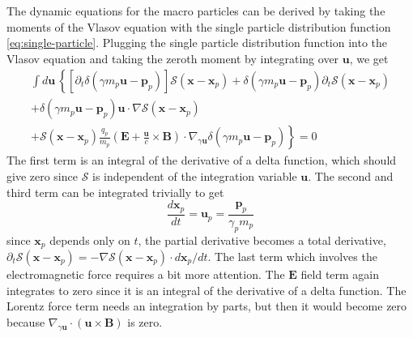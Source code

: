 The dynamic equations for the macro particles can be derived by taking
the moments of the Vlasov equation with the single particle
distribution function \eqref{eq:single-particle}. Plugging the single
particle distribution function into the Vlasov equation and taking the
zeroth moment by integrating over $\mathbf{u}$, we get
\begin{equation}
  \begin{split}
    \int d\mathbf{u}\,\left\{ \left[ \partial_t \delta(\gamma m_{p}\mathbf{u} - \mathbf{p}_p) \right]\mathcal{S}(\mathbf{x} - \mathbf{x}_p) + \delta(\gamma m_{p}\mathbf{u} - \mathbf{p}_p)\partial_t\mathcal{S}(\mathbf{x} - \mathbf{x}_p) \right. \\
    + \delta(\gamma m_{p}\mathbf{u} - \mathbf{p}_p) \mathbf{u}\cdot\nabla \mathcal{S}(\mathbf{x} - \mathbf{x}_p) \\
    \left. + \mathcal{S}(\mathbf{x} - \mathbf{x}_p)\frac{q_p}{m_p}\left(\mathbf{E} +
        \frac{\mathbf{u}}{c}\times \mathbf{B}\right)\cdot \nabla_{\gamma
        \mathbf{u}}\delta(\gamma m_{p}\mathbf{u} - \mathbf{p}_p) \right\} = 0
  \end{split}
\end{equation}
The first term is an integral of the derivative of a delta function,
which should give zero since $\mathcal{S}$ is independent of the integration variable $\mathbf{u}$. The
second and third term can be integrated trivially to get
\begin{equation}
  \label{eq:eom-position}
\frac{d\mathbf{x}_p}{dt} = \mathbf{u}_p = \frac{\mathbf{p}_p}{\gamma_p m_{p}}
\end{equation}
since $\mathbf{x}_p$ depends only on $t$, the partial derivative becomes a total
derivative, $\partial_t\mathcal{S}(\mathbf{x} - \mathbf{x}_p) = -\nabla \mathcal{S}(\mathbf{x} -
\mathbf{x}_p) \cdot d\mathbf{x}_p/dt$. The last term which involves the
electromagnetic force requires a bit more attention. The $\mathbf{E}$ field term
again integrates to zero since it is an integral of the derivative of a delta
function. The Lorentz force term needs an integration by parts, but then it
would become zero because $\nabla_{\gamma \mathbf{u}}\cdot(\mathbf{u}\times
\mathbf{B})$ is zero.



